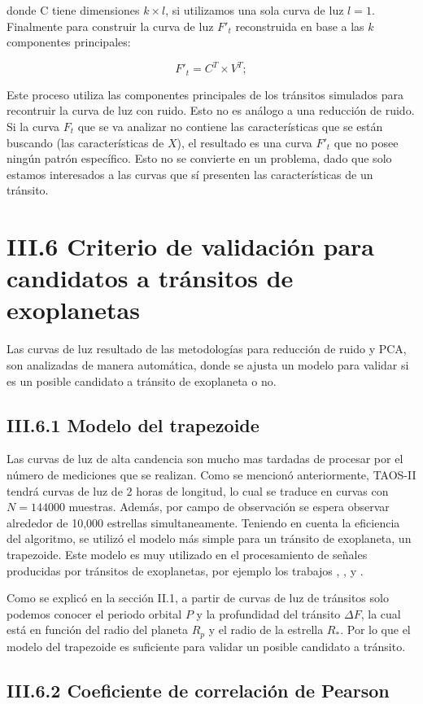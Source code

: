 donde C tiene dimensiones $k\times l$, si utilizamos una sola curva de luz $l=1$. Finalmente para construir la curva de luz $F'_{t}$ reconstruida en base a las $k$ componentes principales:

\begin{equation}
  F'_{t}=C^{T} \times V^{T};
\end{equation}

Este proceso utiliza las componentes principales de los tránsitos simulados para recontruir la curva de luz con ruido. Esto no es análogo a una reducción de ruido. Si la curva $F_{t}$ que se va analizar no contiene las características que se están buscando (las características de $X$), el resultado es una curva $F'_{t}$ que no posee ningún patrón específico. Esto no se convierte en un problema, dado que solo estamos interesados a las curvas que sí presenten las características de un tránsito.


\section*{III.6 Criterio de validación para candidatos a tránsitos de exoplanetas}

Las curvas de luz resultado de las metodologías para reducción de ruido y PCA, son analizadas de manera automática, donde se ajusta un modelo para validar si es un posible candidato a tránsito de exoplaneta o no.

\subsection*{III.6.1 Modelo del trapezoide}

Las curvas de luz de alta candencia son mucho mas tardadas de procesar por el número de mediciones que se realizan. Como se mencionó anteriormente, TAOS-II tendrá curvas de luz de 2 horas de longitud, lo cual se traduce en curvas con $N=144000$ muestras. Además, por campo de observación se espera observar alrededor de 10,000 estrellas simultaneamente. Teniendo en cuenta la eficiencia del algoritmo, se utilizó el modelo más simple para un tránsito de exoplaneta, un trapezoide. Este modelo es muy utilizado en el procesamiento de señales producidas por tránsitos de exoplanetas, por ejemplo los trabajos \cite{alapini2010transiting}, \cite{hippke2019optimized}, \cite{kipping2016observational} y \cite{morton2012efficient}.


Como se explicó en la sección II.1, a partir de curvas de luz de tránsitos solo podemos conocer el periodo orbital $P$ y la profundidad del tránsito $\Delta F$, la cual está en función del radio del planeta $R_{p}$ y el radio de la estrella $R_{*}$. Por lo que el modelo del trapezoide es suficiente para validar un posible candidato a tránsito.

\subsection*{III.6.2 Coeficiente de correlación de Pearson}

